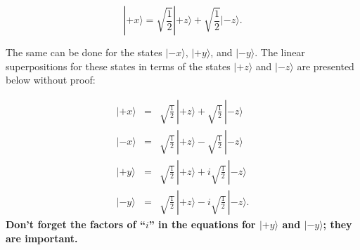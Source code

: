 \begin{equation}
|\mbox{$+x$}\rangle = \sqrt{\frac{1}{2}}|\mbox{$+z$}\rangle + \sqrt{\frac{1}{2}}|\mbox{$-z$}\rangle .
\end{equation}

The same can be done for the states $|\mbox{$-x$}\rangle$,
$|\mbox{$+y$}\rangle$, and $|\mbox{$-y$}\rangle$.  The linear
superpositions for these states in terms of the states
$|\mbox{$+z$}\rangle$ and $|\mbox{$-z$}\rangle$ are presented below
without proof:

\begin{subequations}
\begin{eqnarray}
|\mbox{$+x$}\rangle &=&\sqrt{\frac{1}{2}} \,|\mbox{$+z$}\rangle +
  \sqrt{\frac{1}{2}} \,|\mbox{$-z$}\rangle
\label{eq:plusx}  \\
  |\mbox{$-x$}\rangle &=& \sqrt{\frac{1}{2}}
  \,|\mbox{$+z$}\rangle - \sqrt{\frac{1}{2}} \,|\mbox{$-z$}\rangle
\label{eq:minusx}  \\
  |\mbox{$+y$}\rangle &=&\sqrt{\frac{1}{2}} \,|\mbox{$+z$}\rangle +
  i\sqrt{\frac{1}{2}} \,|\mbox{$-z$}\rangle
\label{eq:plusy}  \\
  |\mbox{$-y$}\rangle &=& \sqrt{\frac{1}{2}}
  \,|\mbox{$+z$}\rangle - i\sqrt{\frac{1}{2}} \,|\mbox{$-z$}\rangle  .
\label{eq:minusy}
\end{eqnarray}
\end{subequations}
{\bf Don't forget the factors of ``$i$'' in the equations for
$|\mbox{$+y$}\rangle$ and $|\mbox{$-y$}\rangle$; they are important.}


